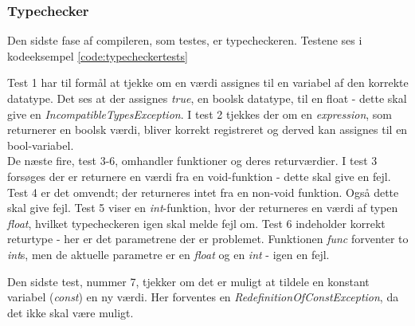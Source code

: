 \clearpage\subsubsection{Typechecker}
Den sidste fase af compileren, som testes, er typecheckeren. Testene ses i kodeeksempel \ref{code:typecheckertests}


\noindent Test 1 har til formål at tjekke om en værdi assignes til en variabel af den korrekte datatype. Det ses at der assignes \textit{true}, en boolsk datatype, til en float - dette skal give en \textit{IncompatibleTypesException}.
\noindent I test 2 tjekkes der om en \textit{expression}, som returnerer en boolsk værdi, bliver korrekt registreret og derved kan assignes til en bool-variabel. \\

\noindent De næste fire, test 3-6, omhandler funktioner og deres returværdier. I test 3 forsøges der er returnere en værdi fra en void-funktion - dette skal give en fejl. Test 4 er det omvendt; der returneres intet fra en non-void funktion. Også dette skal give fejl. Test 5 viser en \textit{int}-funktion, hvor der returneres en værdi af typen \textit{float}, hvilket typecheckeren igen skal melde fejl om. Test 6 indeholder korrekt returtype - her er det parametrene der er problemet. Funktionen \textit{func} forventer to \textit{int}s, men de aktuelle parametre er en \textit{float} og en \textit{int} - igen en fejl.

\noindent Den sidste test, nummer 7,  tjekker om det er muligt at tildele en konstant variabel (\textit{const}) en ny værdi. Her forventes en \textit{RedefinitionOfConstException}, da det ikke skal være muligt.